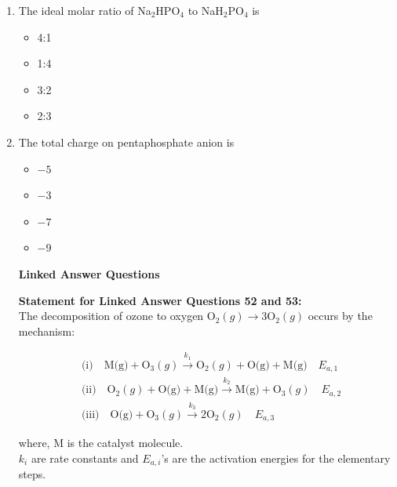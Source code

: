 \documentclass[journal,12pt,onecolumn]{IEEEtran}
\theoremstyle{remark}
\begin{document}
\begin{enumerate}
 

\item    \hspace{0.5cm} The ideal molar ratio of Na\(_2\)HPO\(_4\) to NaH\(_2\)PO\(_4\) is  \hfill{}

\begin{multicols}{2}
\begin{itemize}[label=(A)]
    \item 4:1
    \item 1:4
    \item 3:2
    \item 2:3
\end{itemize}
\end{multicols}

 

\item    \hspace{0.5cm} The total charge on pentaphosphate anion is  \hfill{}

\begin{multicols}{2}
\begin{itemize}[label=(A)]
    \item $-5$
    \item $-3$
    \item $-7$
    \item $-9$
\end{itemize}
\end{multicols}
 



\noindent\textbf{Linked Answer Questions}
 
\noindent\textbf{Statement for Linked Answer Questions 52 and 53:}
 \\
The decomposition of ozone to oxygen \( \text{O}_2 (g) \rightarrow 3\text{O}_2(g) \) occurs by the mechanism:

\begin{align*}
&\text{(i)} \quad \text{M(g)} + \text{O}_3 (g) \xrightarrow{k_1} \text{O}_2 (g) + \text{O(g)} + \text{M(g)} \quad E_{a,1} \\
&\text{(ii)} \quad \text{O}_2 (g) + \text{O(g)} + \text{M(g)} \xrightarrow{k_2} \text{M(g)} + \text{O}_3 (g) \quad E_{a,2} \\
&\text{(iii)} \quad \text{O(g)} + \text{O}_3 (g) \xrightarrow{k_3} 2\text{O}_2 (g) \quad E_{a,3}
\end{align*}

where, M is the catalyst molecule.\\
\(k_i\) are rate constants and \(E_{a,i}\)'s are the activation energies for the elementary steps.


\end{enumerate}
\end{document}
